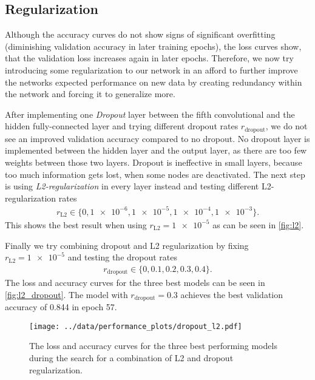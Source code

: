\subsection{Regularization}
Although the accuracy curves do not show signs of significant overfitting (diminishing validation accuracy in later training epochs), the loss curves show, that the validation loss 
increases again in later epochs. 
Therefore, we now try introducing some regularization to our network in an afford to further improve the networks expected performance on new data by creating redundancy within the 
network and forcing it to generalize more.

After implementing one \textit{Dropout} layer between the fifth convolutional and the hidden fully-connected layer and trying different dropout rates $r_\text{dropout}$, we do not see an 
improved validation accuracy compared to no dropout.
No dropout layer is implemented between the hidden layer and the output layer, as there are too few weights between those two layers.
Dropout is ineffective in small layers, because too much information gets lost, when some nodes are deactivated.
The next step is using \textit{L2-regularization} in every layer instead and testing different L2-regularization rates
\begin{align}
    r_\text{L2} \in \{0, \num{1e-6}, \num{1e-5}, \num{1e-4}, \num{1e-3}\}.
\end{align}
This shows the best result when using $r_\text{L2} = \num{1e-5}$ as can be seen in \autoref{fig:l2}.

Finally we try combining dropout and L2 regularization by fixing $r_\text{L2} = \num{1e-5}$ and testing the dropout rates
\begin{align}
    r_\text{dropout} \in \{0, 0.1, 0.2, 0.3, 0.4\}.
\end{align}
The loss and accuracy curves for the three best models can be seen in \autoref{fig:l2_dropout}.
The model with $r_\text{dropout} = 0.3$ achieves the best validation accuracy of 0.844 in epoch 57.
\begin{figure}
    \centering
    \texttt{[image: ../data/performance\_plots/dropout\_l2.pdf]}
    \caption{The loss and accuracy curves for the three best performing models during the search for a combination of L2 and dropout regularization.}
    \label{fig:l2_dropout}
\end{figure}
